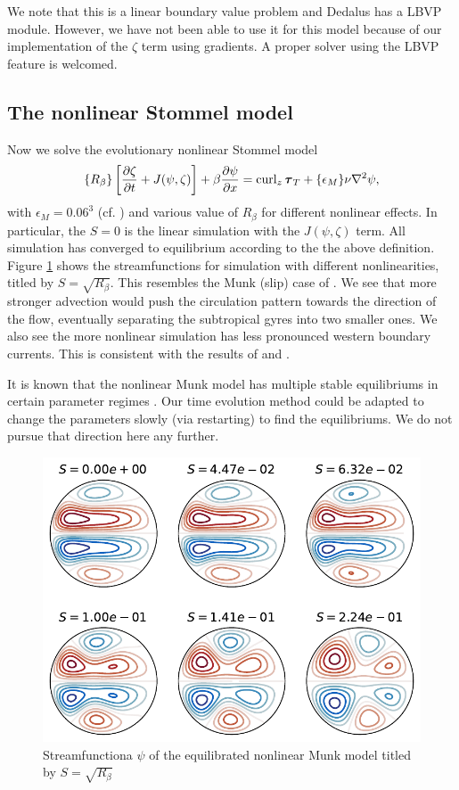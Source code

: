 We note that this is a linear boundary value problem and Dedalus has a LBVP module. However, we have not been able to use it for this model because of our implementation of the $\zeta$ term using gradients. A proper solver using the LBVP feature is welcomed.

\subsection{The nonlinear Stommel model}
Now we solve the evolutionary nonlinear Stommel model
\begin{align}
    \{R_\beta\}\left[\frac{\partial\zeta}{\partial t}+J(\psi,\zeta)\right]+\beta\frac{\partial\psi}{\partial x} = \operatorname{curl}_z\boldsymbol{\tau}_T+\{\epsilon_M\}\nu\nabla^2\psi,
\end{align}
with $\epsilon_M = 0.06^3$ (cf. \cite{IerleySheremet_95}) and various value of $R_\beta$ for different nonlinear effects. In particular, the $S=0$ is the linear simulation with the $J(\psi,\zeta)$ term. All simulation has converged to equilibrium according to the the above definition. Figure \ref{fig:Gyre_munk_zetaall} shows the streamfunctions for simulation with different nonlinearities, titled by $S = \sqrt{R_\beta}$. This resembles the Munk (slip) case of \cite[Fig. 19.11]{Vallis_17}. We see that more stronger advection would push the circulation pattern towards the direction of the flow, eventually separating the subtropical gyres into two smaller ones. We also see the more nonlinear simulation has less pronounced western boundary currents. This is consistent with the results of \cite[Fig. 19.11]{Vallis_17} and \cite[Figure 2]{IerleySheremet_95}.

It is known that the nonlinear Munk model has multiple stable equilibriums in certain parameter regimes \parencite{CessiIerley_95, IerleySheremet_95}. Our time evolution method could be adapted to change the parameters slowly (via restarting) to find the equilibriums. We do not pursue that direction here any further.

\begin{figure}
    \centering
    \includegraphics{Gyre_munk_zetaall}
    \caption{Streamfunctiona $\psi$ of the equilibrated nonlinear Munk model titled by $S = \sqrt{R_\beta}$}
    \label{fig:Gyre_munk_zetaall}
\end{figure}